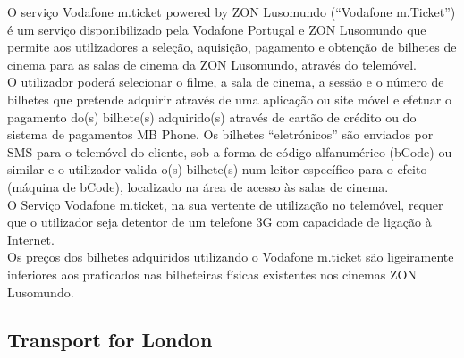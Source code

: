 O serviço Vodafone m.ticket powered by ZON Lusomundo (“Vodafone m.Ticket”) é um serviço disponibilizado pela Vodafone Portugal e ZON Lusomundo que permite aos utilizadores a seleção, aquisição, pagamento e obtenção de bilhetes de cinema para as salas de cinema da ZON Lusomundo, através do telemóvel.
\\O utilizador poderá selecionar o filme, a sala de cinema, a sessão e o número de bilhetes que pretende adquirir através de uma aplicação ou site móvel e efetuar o pagamento do(s) bilhete(s) adquirido(s) através de cartão de crédito ou do sistema de pagamentos MB Phone. Os bilhetes “eletrónicos” são enviados por SMS para o telemóvel do cliente, sob a forma de código alfanumérico (bCode) ou similar e o utilizador valida o(s) bilhete(s) num leitor específico para o efeito (máquina de bCode), localizado na área de acesso às salas de cinema.
\\O Serviço Vodafone m.ticket, na sua vertente de utilização no telemóvel, requer que o utilizador seja detentor de um telefone 3G com capacidade de ligação à Internet.
\\Os preços dos bilhetes adquiridos utilizando o Vodafone m.ticket são ligeiramente inferiores aos praticados nas bilheteiras físicas existentes nos cinemas ZON Lusomundo.\cite{mticket}

\subsection{Transport for London}

